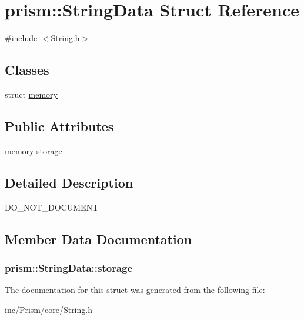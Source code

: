 \hypertarget{structprism_1_1_string_data}{}\section{prism\+:\+:String\+Data Struct Reference}
\label{structprism_1_1_string_data}


{\ttfamily \#include $<$String.\+h$>$}

\subsection*{Classes}
\begin{DoxyCompactItemize}
\item 
struct \hyperlink{structprism_1_1_string_data_1_1memory}{memory}
\end{DoxyCompactItemize}
\subsection*{Public Attributes}
\begin{DoxyCompactItemize}
\item 
\hyperlink{structprism_1_1_string_data_1_1memory}{memory} \hyperlink{structprism_1_1_string_data_afe8efdbe7e9f6a6913dc51bd9177dc0e}{storage}
\end{DoxyCompactItemize}


\subsection{Detailed Description}
D\+O\+\_\+\+N\+O\+T\+\_\+\+D\+O\+C\+U\+M\+E\+NT 

\subsection{Member Data Documentation}
\subsubsection[{\texorpdfstring{storage}{storage}}]{ prism\+::\+String\+Data\+::storage}\hypertarget{structprism_1_1_string_data_afe8efdbe7e9f6a6913dc51bd9177dc0e}{}\label{structprism_1_1_string_data_afe8efdbe7e9f6a6913dc51bd9177dc0e}


The documentation for this struct was generated from the following file\+:\begin{DoxyCompactItemize}
\item 
inc/\+Prism/core/\hyperlink{_string_8h}{String.\+h}\end{DoxyCompactItemize}
